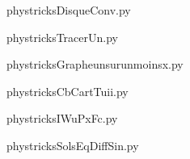     \newcommand{\CaptionFigDisqueConv}{<+Type your caption here+>}
    \begin{center}
        
    \end{center}
    phystricksDisqueConv.py

    

    \clearpage
    


    \newcommand{\CaptionFigTracerUn}{<+Type your caption here+>}
    \begin{center}
        
    \end{center}
    phystricksTracerUn.py

    

    \clearpage
    


    \newcommand{\CaptionFigGrapheunsurunmoinsx}{<+Type your caption here+>}
    \begin{center}
        
    \end{center}
    phystricksGrapheunsurunmoinsx.py

    

    \clearpage
    


    \newcommand{\CaptionFigCbCartTuii}{<+Type your caption here+>}
    \begin{center}
        
    \end{center}
    phystricksCbCartTuii.py

    

    \clearpage
    


    \newcommand{\CaptionFigIWuPxFc}{<+Type your caption here+>}
    \begin{center}
        
    \end{center}
    phystricksIWuPxFc.py

    

    \clearpage
    


    \newcommand{\CaptionFigSolsEqDiffSin}{<+Type your caption here+>}
    \begin{center}
        
    \end{center}
    phystricksSolsEqDiffSin.py


